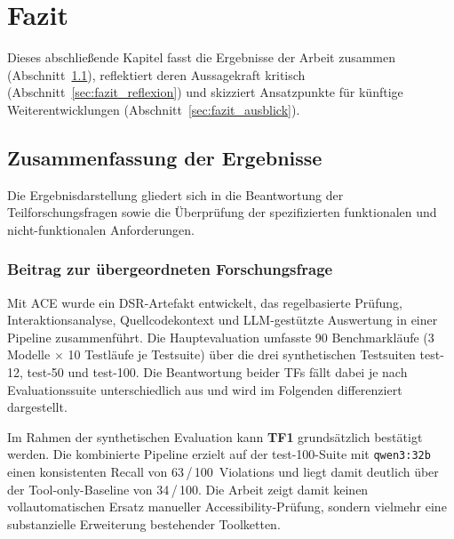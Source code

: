 \chapter{Fazit}
\label{kap:8}

Dieses abschließende Kapitel fasst die Ergebnisse der Arbeit zusammen (Abschnitt~\ref{sec:fazit_zusammenfassung}), reflektiert deren Aussagekraft kritisch (Abschnitt~\ref{sec:fazit_reflexion}) und skizziert Ansatzpunkte für künftige Weiterentwicklungen (Abschnitt~\ref{sec:fazit_ausblick}).

\section{Zusammenfassung der Ergebnisse}
\label{sec:fazit_zusammenfassung}

Die Ergebnisdarstellung gliedert sich in die Beantwortung der Teilforschungsfragen sowie die Überprüfung der spezifizierten funktionalen und nicht-funktionalen Anforderungen.

\subsection{Beitrag zur übergeordneten Forschungsfrage}
\label{sec:fazit_ff}

Mit \ac{ACE} wurde ein \ac{DSR}-Artefakt entwickelt, das regelbasierte Prüfung, Interaktionsanalyse, Quellcodekontext und \ac{LLM}-gestützte Auswertung in einer Pipeline zusammenführt. Die Haupt\-evaluation umfasste 90 Benchmarkläufe (3 Modelle $\times$ 10 Testläufe je Testsuite) über die drei synthetischen Testsuiten test-12, test-50 und test-100. Die Beantwortung beider \acs{TF}s fällt dabei je nach Evaluationssuite unterschiedlich aus und wird im Folgenden differenziert dargestellt.

Im Rahmen der synthetischen Evaluation kann \textbf{\acs{TF}1} grundsätzlich bestätigt werden. Die kombinierte Pipeline erzielt auf der test-100-Suite mit \texttt{qwen3:32b} einen konsistenten Recall von 63\,/\,100~Violations und liegt damit deutlich über der Tool-only-Baseline von 34\,/\,100. Die Arbeit zeigt damit keinen vollautomatischen Ersatz manueller Accessibility-Prüfung, sondern vielmehr eine substanzielle Erweiterung bestehender Toolketten.


